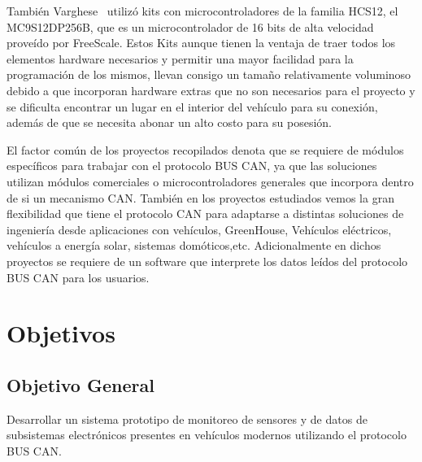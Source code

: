 También Varghese~\cite{ICAN} utilizó kits con microcontroladores de la familia HCS12, el MC9S12DP256B, que es un microcontrolador de 16 bits de alta velocidad proveído por FreeScale. 
Estos Kits aunque tienen la ventaja de traer todos los elementos hardware necesarios y permitir una mayor facilidad para la programación de los mismos, llevan consigo un tamaño relativamente voluminoso debido a que incorporan hardware extras que no son necesarios para el proyecto y se dificulta encontrar un lugar en el interior del vehículo para su conexión, además de que se necesita abonar un alto costo para su posesión.

El factor  común de los proyectos recopilados denota que se requiere de módulos específicos para trabajar con el protocolo BUS CAN, ya que las soluciones  utilizan módulos comerciales  o microcontroladores generales que incorpora dentro de si un mecanismo CAN. 
También en los proyectos estudiados vemos la gran flexibilidad que tiene el protocolo CAN para adaptarse a distintas soluciones de ingeniería desde aplicaciones con vehículos, GreenHouse, Vehículos eléctricos, vehículos a energía solar, sistemas domóticos,etc. 
Adicionalmente en dichos proyectos se requiere de un software que interprete los datos leídos del protocolo BUS CAN para los usuarios.  



 
 


\newpage

\section{Objetivos}


\subsection{Objetivo General}

Desarrollar un sistema prototipo de monitoreo de sensores y de datos de subsistemas electrónicos presentes en vehículos modernos utilizando el protocolo BUS CAN.

